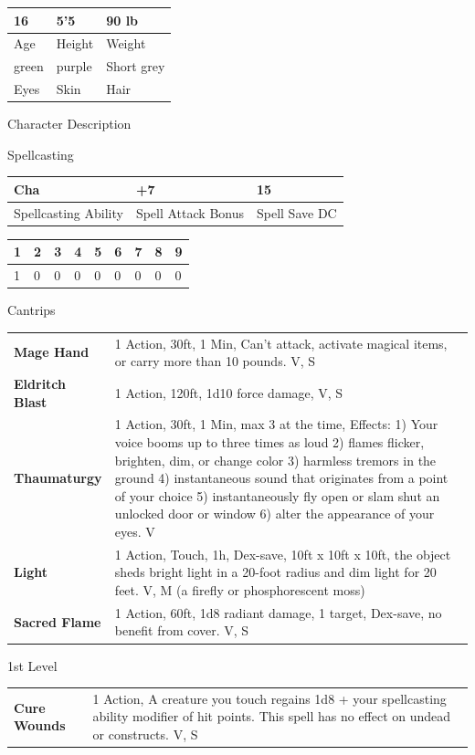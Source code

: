 \documentclass[a4paper,10pt,bg=print]{dndbook} %
\def\Age{16}
\def\Height{5'5}
\def\Weight{90 lb}
\def\Skin{purple}
\def\Eyes{green}
\def\Hair{Short grey}
\def\SpellAbility{Cha}
\def\SpellAtk{+7}
\def\SpellSaveDC{15}
\def\FirstLevelSlots{1}
\def\SecondLevelSlots{0}
\def\ThirdLevelSlots{0}
\def\FourthLevelSlots{0}
\def\FifthLevelSlots{0}
\def\SixthLevelSlots{0}
\def\SeventhLevelSlots{0}
\def\EightLevelSlots{0}
\def\NinthLevelSlots{0}
\def\Cantrips{
	\small %
	\begin{tabularx}{\linewidth}{lX}
		\textbf{Mage Hand} & 1 Action, 30ft, 1 Min, Can’t attack, activate magical items, or carry more than 10 pounds. V, S\\
		\textbf{Eldritch Blast} & 1 Action, 120ft, 1d10 force damage, V, S\\
		\textbf{Thaumaturgy} & 1 Action, 30ft, 1 Min, max 3 at the time, Effects: 1) Your voice booms up to three times as loud 2) flames flicker, brighten, dim, or change color 3) harmless tremors in the ground  4) instantaneous sound that originates from a point of your choice 5) instantaneously fly open or slam shut an unlocked door or window 6) alter the appearance of your eyes. V\\
		\textbf{Light} & 1 Action, Touch, 1h, Dex-save, 10ft x 10ft x 10ft, the object sheds bright light in a 20-foot radius and dim light for 20 feet. V, M (a firefly or phosphorescent moss)\\
		\textbf{Sacred Flame} & 1 Action, 60ft, 1d8 radiant damage, 1 target, Dex-save, no benefit from cover. V, S\\
	\end{tabularx}
}
\def\FirstLevelSpells{
	\begin{tabularx}{\linewidth}{lX}
		\textbf{Cure Wounds} & 1 Action, A creature you touch regains 1d8 + your spellcasting ability modifier of hit points. This spell has no effect on undead or constructs. V, S\\
	\end{tabularx}
}
\def\Description{
	
}
\begin{document}
\begin{minipage}[t][\textheight]{.5\linewidth}
		\begin{tabularx}{\textwidth}{XXX}
			\Age &\Height &\Weight\\\hline
			\tiny{Age}	& \tiny{Height}	&\tiny{Weight}\\
			\Eyes &\Skin &\Hair\\\hline
			\tiny{Eyes}	& \tiny{Skin}	&\tiny{Hair}\\
		\end{tabularx}
		{\LARGE Character Description}\\
		{\scriptsize\Description}
	\end{minipage} %
	{\huge Spellcasting}
	\begin{center}\normalsize
		\begin{tabularx}{\textwidth}{XXX}
			\SpellAbility &\SpellAtk &\SpellSaveDC\\\hline
			\tiny{Spellcasting Ability}	& \tiny{Spell Attack Bonus}	&\tiny{Spell Save DC}
		\end{tabularx}
		\begin{tabularx}{\linewidth}{XXXXXXXXX}
			1&2&3&4&5&6&7&8&9\\\hline
			\FirstLevelSlots&
			\SecondLevelSlots&
			\ThirdLevelSlots&
			\FourthLevelSlots&
			\FifthLevelSlots&
			\SixthLevelSlots&
			\SeventhLevelSlots&
			\EightLevelSlots&
			\NinthLevelSlots
		\end{tabularx}
	\end{center}
	\begin{minipage}[t]{1\linewidth}\scriptsize
		\textcolor{titlered}{\large Cantrips}\\
		\Cantrips
		\textcolor{titlered}{\large 1st Level}\\
		\FirstLevelSpells
	\end{minipage}%
\end{document}
